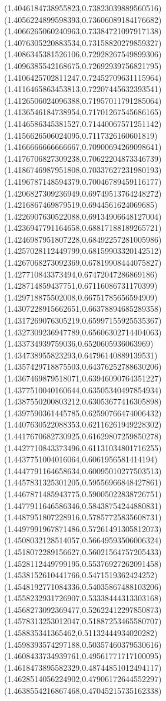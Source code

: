 \documentclass[12pt]{article}
\theoremstyle{plain}
\theoremstyle{definition}
\theoremstyle{remark}
\begin{document}
\begin{figure}
{  (1.4046184738955823,0.73823039889560516)%
  (1.4056224899598393,0.73606089184176682)%
  (1.4066265060240963,0.73384721097917138)%
  (1.4076305220883534,0.73158820279859327)%
  (1.4086345381526106,0.72928267549899306)%
  (1.4096385542168675,0.72692939756821795)%
  (1.4106425702811247,0.72452709631115964)%
  (1.4116465863453813,0.72207445632393541)%
  (1.4126506024096388,0.71957011791285064)%
  (1.4136546184738954,0.71701267545686165)%
  (1.4146586345381527,0.71440067571251142)%
  (1.4156626506024095,0.7117326160601819)%
  (1.4166666666666667,0.70900694269098641)%
  (1.4176706827309238,0.70622204873346739)%
  (1.4186746987951808,0.70337627231980193)%
  (1.4196787148594379,0.70046789459116177)%
  (1.4206827309236949,0.69749513764248272)%
  (1.4216867469879519,0.6944561624069685)%
  (1.4226907630522088,0.69134906648127004)%
  (1.4236947791164658,0.68817188189265721)%
  (1.4246987951807228,0.68492257281005986)%
  (1.4257028112449799,0.68159903320142512)%
  (1.4267068273092369,0.67819908444075827)%
  (1.427710843373494,0.67472047286869186)%
  (1.428714859437751,0.67116086731170399)%
  (1.429718875502008,0.66751785656594909)%
  (1.4307228915662651,0.66378894685289358)%
  (1.4317269076305219,0.65997155925535367)%
  (1.4327309236947789,0.65606302714404063)%
  (1.433734939759036,0.6520605936063969)%
  (1.434738955823293,0.64796140889139531)%
  (1.4357429718875503,0.64376252788630206)%
  (1.4367469879518071,0.63946090764351227)%
  (1.4377510040160644,0.63505340497854934)%
  (1.4387550200803212,0.63053677416305898)%
  (1.4397590361445785,0.62590766474006432)%
  (1.4407630522088353,0.62116261949228302)%
  (1.4417670682730925,0.61629807259850278)%
  (1.4427710843373496,0.61131034801716255)%
  (1.4437751004016064,0.6061956581414194)%
  (1.4447791164658634,0.60095010277503513)%
  (1.4457831325301205,0.59556966848427861)%
  (1.4467871485943775,0.59005022838726751)%
  (1.4477911646586346,0.58438754244880831)%
  (1.4487951807228916,0.57857725835608731)%
  (1.4497991967871486,0.57261491305812073)%
  (1.4508032128514057,0.56649593506006324)%
  (1.4518072289156627,0.56021564757205433)%
  (1.4528112449799195,0.55376927262091458)%
  (1.4538152610441766,0.5471519362424252)%
  (1.4548192771084336,0.54035867488103206)%
  (1.4558232931726907,0.53338444313303168)%
  (1.4568273092369477,0.52622412297850873)%
  (1.4578313253012047,0.51887253465580707)%
  (1.458835341365462,0.51132444934020282)%
  (1.4598393574297188,0.50357460379530616)%
  (1.4608433734939761,0.49561771717100095)%
  (1.4618473895582329,0.48744851012494117)%
  (1.4628514056224902,0.47906172644552297)%
  (1.4638554216867468,0.47045215735162338)%
}
\end{figure}
\end{document}
